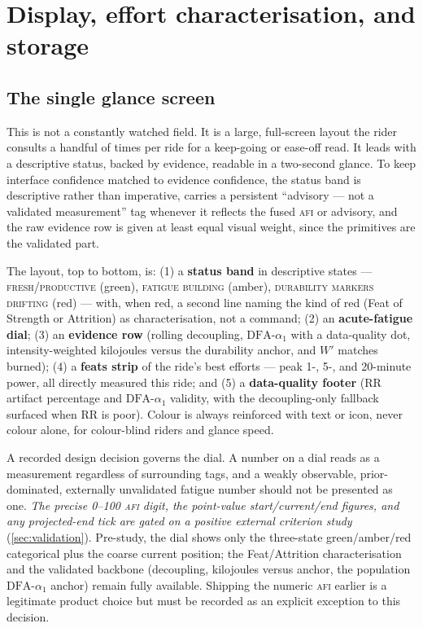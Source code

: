\documentclass[11pt]{article}
\newcommand{\afi}{\textup{\textsc{afi}}}
\newcommand{\aone}{\ensuremath{\text{DFA-}\alpha_1}}
\begin{document}
\section{Display, effort characterisation, and storage}\label{sec:display}

\subsection{The single glance screen}\label{sec:glance}
This is not a constantly watched field. It is a large, full-screen layout the rider consults a handful of times per ride for a keep-going or ease-off read. It leads with a descriptive status, backed by evidence, readable in a two-second glance. To keep interface confidence matched to evidence confidence, the status band is descriptive rather than imperative, carries a persistent ``advisory --- not a validated measurement'' tag whenever it reflects the fused \afi{} or advisory, and the raw evidence row is given at least equal visual weight, since the primitives are the validated part.

The layout, top to bottom, is: (1) a \textbf{status band} in descriptive states --- \textsc{fresh/productive} (green), \textsc{fatigue building} (amber), \textsc{durability markers drifting} (red) --- with, when red, a second line naming the kind of red (Feat of Strength or Attrition) as characterisation, not a command; (2) an \textbf{acute-fatigue dial}; (3) an \textbf{evidence row} (rolling decoupling, $\aone$ with a data-quality dot, intensity-weighted kilojoules versus the durability anchor, and $W'$ matches burned); (4) a \textbf{feats strip} of the ride's best efforts --- peak 1-, 5-, and 20-minute power, all directly measured this ride; and (5) a \textbf{data-quality footer} (RR artifact percentage and $\aone$ validity, with the decoupling-only fallback surfaced when RR is poor). Colour is always reinforced with text or icon, never colour alone, for colour-blind riders and glance speed.

A recorded design decision governs the dial. A number on a dial reads as a measurement regardless of surrounding tags, and a weakly observable, prior-dominated, externally unvalidated fatigue number should not be presented as one. \emph{The precise 0--100 \afi{} digit, the point-value start/current/end figures, and any projected-end tick are gated on a positive external criterion study} (\autoref{sec:validation}). Pre-study, the dial shows only the three-state green/amber/red categorical plus the coarse current position; the Feat/Attrition characterisation and the validated backbone (decoupling, kilojoules versus anchor, the population $\aone$ anchor) remain fully available. Shipping the numeric \afi{} earlier is a legitimate product choice but must be recorded as an explicit exception to this decision.
\end{document}
